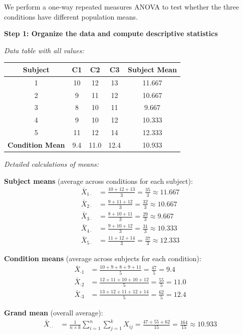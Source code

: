 \documentclass[12pt]{article}
\begin{document}
\begin{solution}
We perform a one-way repeated measures ANOVA to test whether the three conditions have different population means.

\textbf{Step 1: Organize the data and compute descriptive statistics}

\textit{Data table with all values:}

\begin{center}
\begin{tabular}{c|ccc|c}
\textbf{Subject} & \textbf{C1} & \textbf{C2} & \textbf{C3} & \textbf{Subject Mean} \\
\hline
1 & 10 & 12 & 13 & 11.667 \\
2 & 9 & 11 & 12 & 10.667 \\
3 & 8 & 10 & 11 & 9.667 \\
4 & 9 & 10 & 12 & 10.333 \\
5 & 11 & 12 & 14 & 12.333 \\
\hline
\textbf{Condition Mean} & 9.4 & 11.0 & 12.4 & 10.933
\end{tabular}
\end{center}

\textit{Detailed calculations of means:}

\textbf{Subject means} (average across conditions for each subject):
\begin{align*}
\bar{X}_{1\cdot} &= \frac{10 + 12 + 13}{3} = \frac{35}{3} \approx 11.667 \\
\bar{X}_{2\cdot} &= \frac{9 + 11 + 12}{3} = \frac{32}{3} \approx 10.667 \\
\bar{X}_{3\cdot} &= \frac{8 + 10 + 11}{3} = \frac{29}{3} \approx 9.667 \\
\bar{X}_{4\cdot} &= \frac{9 + 10 + 12}{3} = \frac{31}{3} \approx 10.333 \\
\bar{X}_{5\cdot} &= \frac{11 + 12 + 14}{3} = \frac{37}{3} \approx 12.333
\end{align*}

\textbf{Condition means} (average across subjects for each condition):
\begin{align*}
\bar{X}_{\cdot 1} &= \frac{10 + 9 + 8 + 9 + 11}{5} = \frac{47}{5} = 9.4 \\
\bar{X}_{\cdot 2} &= \frac{12 + 11 + 10 + 10 + 12}{5} = \frac{55}{5} = 11.0 \\
\bar{X}_{\cdot 3} &= \frac{13 + 12 + 11 + 12 + 14}{5} = \frac{62}{5} = 12.4
\end{align*}

\textbf{Grand mean} (overall average):
\begin{align*}
\bar{X}_{\cdot\cdot} &= \frac{1}{n \times k} \sum_{i=1}^{n}\sum_{j=1}^{k} X_{ij} = \frac{47 + 55 + 62}{15} = \frac{164}{15} \approx 10.933
\end{align*}


\end{solution}
\end{document}
